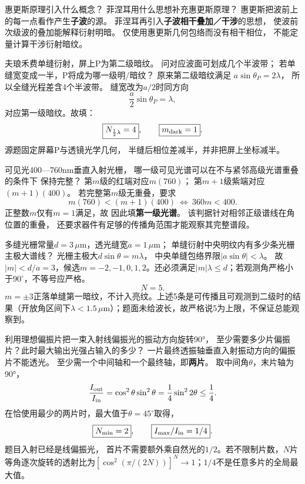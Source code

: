 \problemtext 惠更斯原理引入什么概念？
菲涅耳用什么思想补充惠更斯原理？
\workings
惠更斯把波前上的每一点看作产生\textbf{子波}的源。
菲涅耳再引入\textbf{子波相干叠加／干涉}的思想，
使波前次级波的叠加能解释衍射明暗。
\crosscheck 仅使用惠更斯几何包络而没有相干相位，
不能定量计算干涉衍射暗纹。

\problemtext 夫琅禾费单缝衍射，屏上P为第二级暗纹。
问对应波面可划成几个半波带；
若单缝宽变成一半，P将成为哪一级明/暗纹？
\workings
原来第二级暗纹满足
$a\sin\theta_P=2\lambda$，
所以全缝光程差含4个半波带。
缝宽改为$a/2$时同方向
\[
\frac a2\sin\theta_P=\lambda,
\]
对应第一级暗纹。故填：
\[
\boxed{N_{\frac12\lambda}=4},\qquad
\boxed{m_{\rm dark}=1}.
\]
\crosscheck 源题固定屏幕P与透镜光学几何，
半缝后相位差减半，并非把屏上坐标减半。

\problemtext 可见光400—760nm垂直入射光栅，
哪一级可见光谱可以在不与紧邻高级光谱重叠的条件下
保持完整？
\workings
第$m$级的红端对应$m(760)$；
第$m+1$级紫端对应$(m+1)(400)$。
若完整第$m$级无重叠，要求
\[
m(760)<(m+1)(400)
\ \Longleftrightarrow\ 360m<400.
\]
正整数$m$仅有$m=1$满足，故
因此填\textbf{第一级光谱}。
\crosscheck 该判据针对相邻正级谱线在角位置的重叠，
还要求器件有足够的传播角范围才能观察其完整谱段。

\problemtext 多缝光栅常量$d=3\,\mu$m，透光缝宽$a=1\,\mu$m；
单缝衍射中央明纹内有多少条光栅主极大谱线？
\workings
光栅主极大$d\sin\theta=m\lambda$，
中央单缝包络界限$|a\sin\theta|<\lambda$。
故$|m|<d/a=3$，候选$m=-2,-1,0,1,2$。还必须满足$|m|\lambda\le d$；若观测角严格小于$90^\circ$，不等号应严格。
\[
\boxed{N=5}.
\]
\crosscheck $m=\pm3$正落单缝第一暗纹，不计入亮纹。上述5条是可传播且可观测到二级时的结果（开放角区间下$\lambda<1.5\,\mu$m）；题面未给波长，故严格说5为上限，不保证总能观察到。

\problemtext 利用理想偏振片把一束入射线偏振光的振动方向旋转90°，
至少需要多少片偏振片？此时最大输出光强占输入的多少？
\workings
一片最终透振轴垂直入射振动方向的偏振片不能透光。
至少需一个中间轴和一个最终轴，即\textbf{两片}。
取中间角$\theta$，末片轴为90°，
\[
\frac{I_{\rm out}}{I_{\rm in}}=
\cos^2\theta\sin^2\theta
=\frac14\sin^22\theta\le\frac14.
\]
在恰使用最少的两片时，最大值于$\theta=45^\circ$取得，
\[
\boxed{N_{\min}=2},\qquad\boxed{I_{\max}/I_{\rm in}=1/4}.
\]
\crosscheck 题目入射已经是线偏振光，
首片不需要额外乘自然光的$1/2$。若不限制片数，$N$片等角逐次旋转的透射比为$[\cos^2(\pi/(2N))]^N\to1$；$1/4$不是任意多片的全局最大值。

